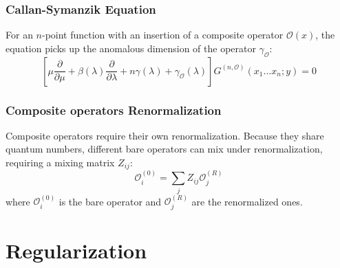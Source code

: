 \documentclass{article}
\begin{document}
\subsubsection*{Callan-Symanzik Equation}
For an $n$-point function with an insertion of a composite operator $\mathcal{O}(x)$, the equation picks up the anomalous dimension of the operator $\gamma_\mathcal{O}$:
\begin{equation}
    \left[ \mu \frac{\partial}{\partial \mu} + \beta(\lambda) \frac{\partial}{\partial \lambda} + n \gamma(\lambda) + \gamma_{\mathcal{O}}(\lambda) \right] G^{(n, \mathcal{O})}(x_1 \dots x_n; y) = 0
\end{equation}
\subsubsection*{Composite operators Renormalization}
Composite operators require their own renormalization. Because they share quantum numbers, different bare operators can mix under renormalization, requiring a mixing matrix $Z_{ij}$:
\begin{equation}
    \mathcal{O}_i^{(0)} = \sum_j Z_{ij} \mathcal{O}_j^{(R)}
\end{equation}
where $\mathcal{O}_i^{(0)}$ is the bare operator and $\mathcal{O}_j^{(R)}$ are the renormalized ones.

\newpage
\section{Regularization}
\end{document}
